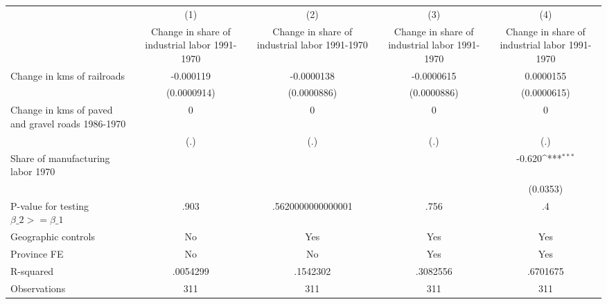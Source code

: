 {
\def\sym#1{\ifmmode^{#1}\else\(^{#1}\)\fi}
\begin{tabular}{l*{4}{c}}
\hline\hline
                &\multicolumn{1}{c}{(1)}&\multicolumn{1}{c}{(2)}&\multicolumn{1}{c}{(3)}&\multicolumn{1}{c}{(4)}\\
                &\multicolumn{1}{c}{Change in share of industrial labor 1991-1970}&\multicolumn{1}{c}{Change in share of industrial labor 1991-1970}&\multicolumn{1}{c}{Change in share of industrial labor 1991-1970}&\multicolumn{1}{c}{Change in share of industrial labor 1991-1970}\\
\hline
Change in kms of railroads&-0.000119         &-0.0000138         &-0.0000615         &0.0000155         \\
                &(0.0000914)         &(0.0000886)         &(0.0000886)         &(0.0000615)         \\
[1em]
Change in kms of paved and gravel roads 1986-1970&        0         &        0         &        0         &        0         \\
                &      (.)         &      (.)         &      (.)         &      (.)         \\
[1em]
Share of manufacturing labor 1970&                  &                  &                  &   -0.620\sym{***}\\
                &                  &                  &                  & (0.0353)         \\
\hline
P-value for testing $\beta\_{2} >= \beta\_{1}$&     .903         &.5620000000000001         &     .756         &       .4         \\
Geographic controls&       No         &      Yes         &      Yes         &      Yes         \\
Province FE     &       No         &       No         &      Yes         &      Yes         \\
R-squared       & .0054299         & .1542302         & .3082556         & .6701675         \\
Observations    &      311         &      311         &      311         &      311         \\
\hline\hline
\end{tabular}
}
